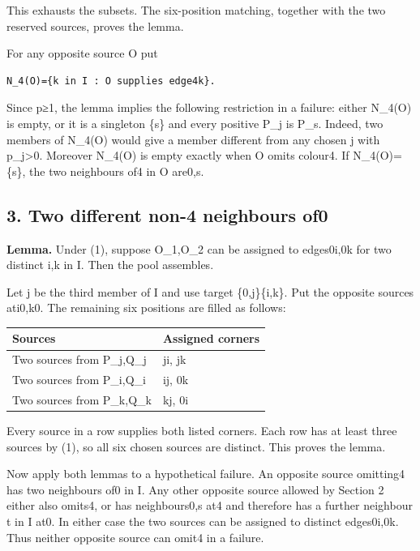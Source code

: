 \documentclass[
  10pt,
]{article}
\begin{document}
This exhausts the subsets. The six-position matching, together with the
two reserved sources, proves the lemma.

For any opposite source O put

\begin{verbatim}
N_4(O)={k in I : O supplies edge4k}.
\end{verbatim}

Since p≥1, the lemma implies the following restriction in a failure:
either N\_4(O) is empty, or it is a singleton \{s\} and every positive
P\_j is P\_s. Indeed, two members of N\_4(O) would give a member
different from any chosen j with p\_j\textgreater0. Moreover N\_4(O) is
empty exactly when O omits colour4. If N\_4(O)=\{s\}, the two neighbours
of4 in O are0,s.

\hypertarget{two-different-non-4-neighbours-of0}{%
\subsection*{3. Two different non-4 neighbours
of0}\label{two-different-non-4-neighbours-of0}}

\textbf{Lemma.} Under (1), suppose O\_1,O\_2 can be assigned to
edges0i,0k for two distinct i,k in I. Then the pool assembles.

Let j be the third member of I and use target \{0,j\}\textbar\{i,k\}.
Put the opposite sources ati0,k0. The remaining six positions are filled
as follows:

\begin{longtable}[]{@{}ll@{}}
\toprule\noalign{}
Sources & Assigned corners \\
\midrule\noalign{}
\endhead
\bottomrule\noalign{}
\endlastfoot
Two sources from P\_j,Q\_j & ji, jk \\
Two sources from P\_i,Q\_i & ij, 0k \\
Two sources from P\_k,Q\_k & kj, 0i \\
\end{longtable}

Every source in a row supplies both listed corners. Each row has at
least three sources by (1), so all six chosen sources are distinct. This
proves the lemma.

Now apply both lemmas to a hypothetical failure. An opposite source
omitting4 has two neighbours of0 in I. Any other opposite source allowed
by Section 2 either also omits4, or has neighbours0,s at4 and therefore
has a further neighbour t in I at0. In either case the two sources can
be assigned to distinct edges0i,0k. Thus neither opposite source can
omit4 in a failure.
\end{document}
